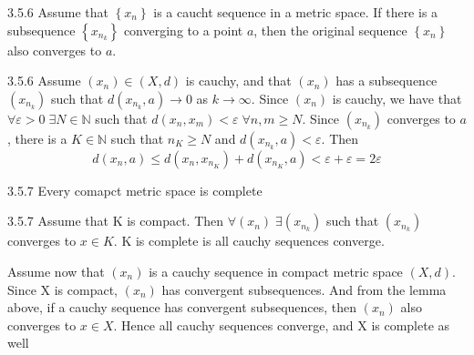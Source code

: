 \documentclass[a4paper,norsk]{article}
\renewcommand{\geq}{\geqslant}
\renewcommand{\leq}{\leqslant}
\renewcommand{\epsilon}{\varepsilon}
\begin{document}
\begin{lemmabox}{3.5.6}{}
Assume that $ \left\{ x_n \right\}  $ is a caucht sequence in a metric space. If there is a subsequence $ \left\{ x_{n_k} \right\}  $ converging to a point $ a $, then the original sequence $ \left\{ x_n \right\}  $ also converges to $ a $.

\begin{proofbox}{3.5.6}{}
  Assume $ \left( x_n \right) \in \left( X, d \right)   $ is cauchy, and that $ \left( x_n \right)  $ has a subsequence $ \left( x_{n_k} \right)  $ such that $ d \left( x_{n_k}, a \right) \to 0 $  as $ k \to \infty $. Since $ \left( x_n \right)  $  is cauchy, we have that $ \forall \epsilon > 0 \; \exists N \in \mathbb{N} $ such that $ d \left( x_n, x_m \right) < \epsilon  \; \forall n, m \geq N $. Since $ \left( x_{n_k} \right)  $   converges to $ a $, there is a $ K \in \mathbb{N} $ such that $ n_K \geq N $ and $ d \left( x_{n_k}, a \right) < \epsilon  $. Then
  \[
      d \left( x_n, a \right) \leq d \left( x_n, x_{n_K} \right) + d \left( x_{n_K}, a \right) < \epsilon + \epsilon = 2 \epsilon 
  \]
  
\end{proofbox}
\end{lemmabox}

\begin{propositionbox}{3.5.7}{}
Every comapct metric space is complete

\begin{proofbox}{3.5.7}{}
  Assume that K is compact. Then $ \forall \left( x_n \right) \; \exists \left( x_{n_k} \right)  $ such that $ \left( x_{n_k} \right)  $ converges to $ x \in K $. K is complete is all cauchy sequences converge.

  Assume now that $ \left( x_n \right)  $ is a cauchy sequence in compact metric space $ \left( X, d \right)  $. Since X is compact, $ \left( x_n \right)  $ has convergent subsequences. And from the lemma above, if a cauchy sequence has convergent subsequences, then $ \left( x_n \right)  $ also converges to $ x \in X $. Hence all cauchy sequences converge, and X is complete as well
\end{proofbox}
\end{propositionbox}
\end{document}
